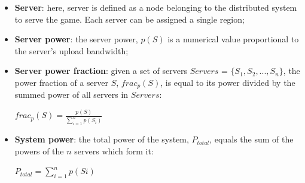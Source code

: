 
\begin{itemize}
	\item \textbf{Server}: here, server is defined as a node belonging to the distributed system to serve the game. Each server can be assigned a single region;
	\item \textbf{Server power}: the server power, $p(S)$ is a numerical value proportional to the server's upload bandwidth;
	\item \textbf{Server power fraction}: given a set of servers $Servers$ = $\{S_1, S_2, ..., S_n\}$, the power fraction of a server $S$, $frac_p(S)$, is equal to its power divided by the summed power of all servers in $Servers$:
	
		\begin{center}
			$frac_p(S) = \frac{\displaystyle p(S)}{\displaystyle\sum_{i=1}^{n} p(S_i)}$
		\end{center}
		
	\item \textbf{System power}: the total power of the system, $P_{total}$, equals the sum of the powers of the $n$ servers which form it:
	
		\begin{center}
			$\displaystyle P_{total} = \sum_{i=1}^{n} p(Si)$
		\end{center}
	

\end{itemize}
